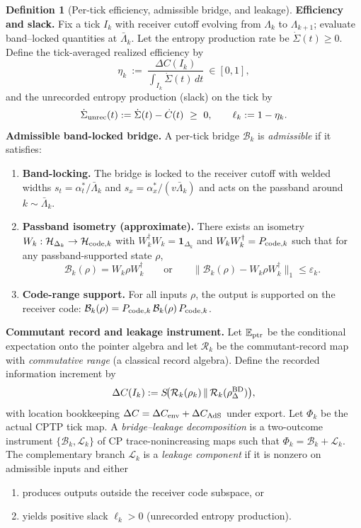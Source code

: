 \documentclass[10pt]{article}
\theoremstyle{definition}
\newtheorem{definition}{Definition}[section]
\theoremstyle{plain}
\begin{document}
\begin{definition}[Per-tick efficiency, admissible bridge, and leakage]\label{def:eta-bridge-leak}
\textbf{Efficiency and slack.}
Fix a tick $I_k$ with receiver cutoff evolving from $\Lambda_k$ to $\Lambda_{k+1}$; evaluate
band--locked quantities at $\bar\Lambda_k$. Let the entropy production rate be
$\dot{\Sigma}(t)\ge 0$. Define the tick-averaged realized efficiency by
\[
\eta_k\ :=\ \frac{\Delta C(I_k)}{\int_{I_k}\dot{\Sigma}(t)\,dt}\ \in[0,1],
\]
and the unrecorded entropy production (slack) on the tick by
\[
\dot{\Sigma}_{\rm unrec}(t):=\dot{\Sigma}(t)-\dot C(t)\ \ge\ 0,
\qquad
\ell_k:=1-\eta_k.
\]
\textbf{Admissible band-locked bridge.}
A per-tick bridge $\mathcal B_k$ is \emph{admissible} if it satisfies:
\begin{enumerate}[label=(B\arabic*),leftmargin=2.2em]
\item \textbf{Band-locking.} The bridge is locked to the receiver cutoff with welded widths
$s_t=\alpha_t^\ast/\bar\Lambda_k$ and $s_x=\alpha_x^\ast/(v\bar\Lambda_k)$ and acts on the
passband around $k\sim\bar\Lambda_k$.
\item \textbf{Passband isometry (approximate).} There exists an isometry
$W_k:\mathcal H_{\Delta_k}\to\mathcal H_{{\rm code},k}$ with
$W_k^\dagger W_k=\mathbf 1_{\Delta_k}$ and $W_k W_k^\dagger=P_{{\rm code},k}$ such that
for any passband-supported state $\rho$,
\[
\mathcal B_k(\rho)=W_k\rho W_k^\dagger
\qquad\text{or}\qquad
\|\mathcal B_k(\rho)-W_k\rho W_k^\dagger\|_1\le \varepsilon_k.
\]
\item \textbf{Code-range support.} For all inputs $\rho$, the output is supported on the receiver code:
$\mathcal B_k(\rho)=P_{{\rm code},k}\,\mathcal B_k(\rho)\,P_{{\rm code},k}$.
\end{enumerate}
\textbf{Commutant record and leakage instrument.}
Let $\mathbb E_{\rm ptr}$ be the conditional expectation onto the pointer algebra and
let $\mathcal R_k$ be the commutant-record map with \emph{commutative range}
(a classical record algebra). Define the recorded information increment by
\[
\Delta C(I_k):=S\!\big(\mathcal R_k(\rho_k)\,\|\,\mathcal R_k(\rho^{\rm BD}_\Delta)\big),
\]
with location bookkeeping $\Delta C=\Delta C_{\rm env}+\Delta C_{\rm AdS}$ under export.
Let $\Phi_k$ be the actual CPTP tick map. A \emph{bridge--leakage decomposition} is a
two-outcome instrument $\{\mathcal B_k,\mathcal L_k\}$ of CP trace-nonincreasing maps
such that $\Phi_k=\mathcal B_k+\mathcal L_k$.
The complementary branch $\mathcal L_k$ is a \emph{leakage component} if it is nonzero on
admissible inputs and either
\begin{enumerate}[label=(L\arabic*),leftmargin=2.2em]
\item produces outputs outside the receiver code subspace, or
\item yields positive slack $\ell_k>0$ (unrecorded entropy production).
\end{enumerate}
\end{definition}
\end{document}
